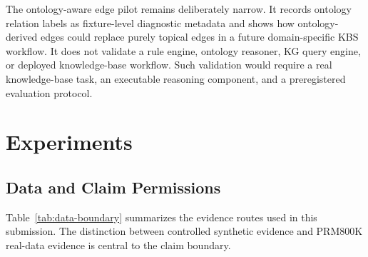 \documentclass[a4paper,fleqn]{cas-sc}
\begin{document}
The ontology-aware edge pilot remains deliberately narrow. It records ontology relation labels as fixture-level diagnostic metadata and shows how ontology-derived edges could replace purely topical edges in a future domain-specific KBS workflow. It does not validate a rule engine, ontology reasoner, KG query engine, or deployed knowledge-base workflow. Such validation would require a real knowledge-base task, an executable reasoning component, and a preregistered evaluation protocol.

\section{Experiments}
\label{sec:experiments}

\subsection{Data and Claim Permissions}

Table~\ref{tab:data-boundary} summarizes the evidence routes used in this submission. The distinction between controlled synthetic evidence and PRM800K real-data evidence is central to the claim boundary.
\end{document}
